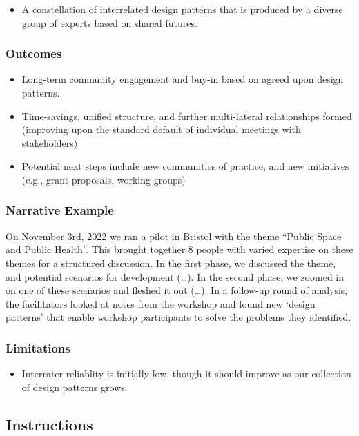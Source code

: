 \documentclass{article}
\begin{document}
\begin{itemize}
\item A constellation of interrelated design patterns that is produced by a diverse group of experts based on shared futures.
\end{itemize}

\subsubsection{Outcomes}

\begin{itemize}
\item Long-term community engagement and buy-in based on agreed upon design patterns.
\item Time-savings, unified structure, and further multi-lateral relationships formed (improving upon the standard default of individual meetings with stakeholders)
\item Potential next steps include new communities of practice, and new initiatives (e.g., grant proposals, working groups)
\end{itemize}

\subsubsection{Narrative Example}

On November 3rd, 2022 we ran a pilot in Bristol with the theme ``Public
Space and Public Health''.  This brought together 8 people with varied
expertise on these themes for a structured discussion.  In the first
phase, we discussed the theme, and potential scenarios for development
(\ldots{}).  In the second phase, we zoomed in on one of these scenarios
and fleshed it out (\ldots{}).  In a follow-up round of analysis, the
facilitators looked at notes from the workshop and found new ‘design
patterns’ that enable workshop participants to solve the problems they
identified.

\subsubsection{Limitations}

\begin{itemize}
\item Interrater reliablity is initially low, though it should improve as
our collection of design patterns grows.
\end{itemize}

\subsection{Instructions}
\end{document}
